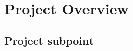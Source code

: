 \documentclass[11pt]{article}
\begin{document}
\tableofcontents
\section{Project Overview}
\subsection{Project subpoint}
\end{document}
